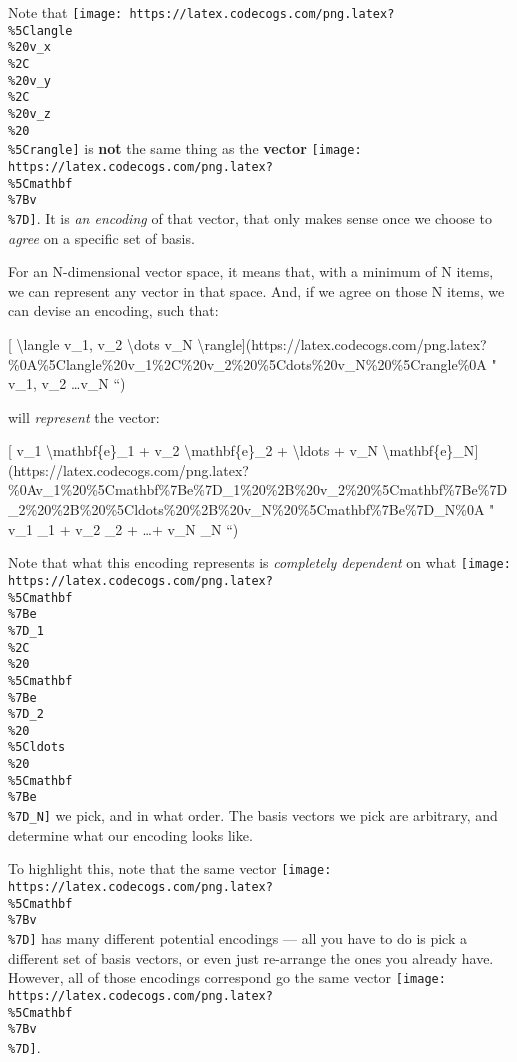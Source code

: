 \documentclass[]{article}
\begin{document}
Note that
\texttt{[image: https://latex.codecogs.com/png.latex?\\\%5Clangle\\\%20v\_x\\\%2C\\\%20v\_y\\\%2C\\\%20v\_z\\\%20\\\%5Crangle]}
is \textbf{not} the same thing as the \textbf{vector}
\texttt{[image: https://latex.codecogs.com/png.latex?\\\%5Cmathbf\\\%7Bv\\\%7D]}. It
is \emph{an encoding} of that vector, that only makes sense once we choose to
\emph{agree} on a specific set of basis.

For an N-dimensional vector space, it means that, with a minimum of N items, we
can represent any vector in that space. And, if we agree on those N items, we
can devise an encoding, such that:

{[} \textbackslash{}langle v\_1, v\_2 \textbackslash{}dots v\_N
\textbackslash{}rangle{]}(https://latex.codecogs.com/png.latex?\%0A\%5Clangle\%20v\_1\%2C\%20v\_2\%20\%5Cdots\%20v\_N\%20\%5Crangle\%0A
" \langle v\_1, v\_2 \dots v\_N \rangle ``)

will \emph{represent} the vector:

{[} v\_1 \textbackslash{}mathbf\{e\}\_1 + v\_2 \textbackslash{}mathbf\{e\}\_2 +
\textbackslash{}ldots + v\_N
\textbackslash{}mathbf\{e\}\_N{]}(https://latex.codecogs.com/png.latex?\%0Av\_1\%20\%5Cmathbf\%7Be\%7D\_1\%20\%2B\%20v\_2\%20\%5Cmathbf\%7Be\%7D\_2\%20\%2B\%20\%5Cldots\%20\%2B\%20v\_N\%20\%5Cmathbf\%7Be\%7D\_N\%0A
" v\_1 \_1 + v\_2 \_2 + \ldots + v\_N \_N ``)

Note that what this encoding represents is \emph{completely dependent} on what
\texttt{[image: https://latex.codecogs.com/png.latex?\\\%5Cmathbf\\\%7Be\\\%7D\_1\\\%2C\\\%20\\\%5Cmathbf\\\%7Be\\\%7D\_2\\\%20\\\%5Cldots\\\%20\\\%5Cmathbf\\\%7Be\\\%7D\_N]}
we pick, and in what order. The basis vectors we pick are arbitrary, and
determine what our encoding looks like.

To highlight this, note that the same vector
\texttt{[image: https://latex.codecogs.com/png.latex?\\\%5Cmathbf\\\%7Bv\\\%7D]} has
many different potential encodings --- all you have to do is pick a different
set of basis vectors, or even just re-arrange the ones you already have.
However, all of those encodings correspond go the same vector
\texttt{[image: https://latex.codecogs.com/png.latex?\\\%5Cmathbf\\\%7Bv\\\%7D]}.
\end{document}
